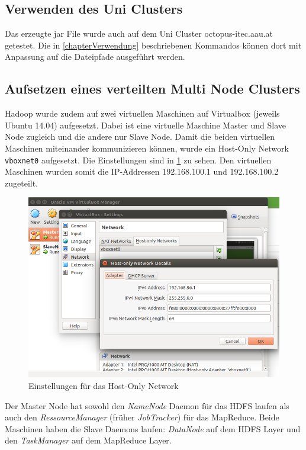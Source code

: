 \documentclass[paper=a4, fontsize=11pt]{scrartcl} %
\numberwithin{equation}{section} %
\numberwithin{figure}{section} %
\numberwithin{table}{section} %
\begin{document}
\subsection{Verwenden des Uni Clusters}
Das erzeugte jar File wurde auch auf dem Uni Cluster octopus-itec.aau.at getestet. Die in \ref{chapterVerwendung} beschriebenen Kommandos können dort mit Anpassung auf die Dateipfade ausgeführt werden.

\subsection{Aufsetzen eines verteilten Multi Node Clusters}
Hadoop wurde zudem auf zwei virtuellen Maschinen auf Virtualbox (jeweils Ubuntu 14.04) aufgesetzt. Dabei ist eine virtuelle Maschine Master und Slave Node zugleich und die andere nur Slave Node. Damit die beiden virtuellen Maschinen miteinander kommunizieren können, wurde ein Host-Only Network \lstinline$vboxnet0$ aufgesetzt. Die Einstellungen sind in \ref{fig:s3} zu sehen. Den virtuellen Maschinen wurden somit die IP-Addressen 192.168.100.1 und 192.168.100.2 zugeteilt. 

\begin{figure}[H]
\begin{center}
	\includegraphics[width=\textwidth]{images/screen3}
	\caption{Einstellungen für das Host-Only Network}
	\label{fig:s3}
\end{center}
\end{figure}

Der Master Node hat sowohl den \emph{NameNode} Daemon für das HDFS laufen als auch den \emph{RessourceManager} (früher \emph{JobTracker}) für das MapReduce. Beide Maschinen haben die Slave Daemons laufen: \emph{DataNode} auf dem HDFS Layer und den \emph{TaskManager} auf dem MapReduce Layer. 
\end{document}
